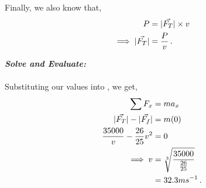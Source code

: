 \begin{subquestions}
\begin{subsubquestions}
Finally, we also know that,
\begin{align}
	P & = |\vec{F_T}|\times v \nonumber \\
	\implies |\vec{F_T}| & = \frac{P}{v} \,. \label{2009:q5:PEqn2}
\end{align}
	



\textbf{\textit{Solve and Evaluate:}} \\ \\
Substituting our values into , we get,
\begin{align}
	\sum F_x & = ma_x \nonumber \\
	|\vec{F_T}|-|\vec{F_f}| & = m(0) \nonumber \\
	\frac{35000}{v} - \frac{26}{25}v^2 & = 0 \nonumber \\
	\implies v & = \sqrt[3]{\frac{35000}{\frac{26}{25}}} \nonumber \\
	           & = 32.3 ms^{-1} \,.
\end{align}



	
	
	
\end{subsubquestions}
	
	
	
	
\end{subquestions}










